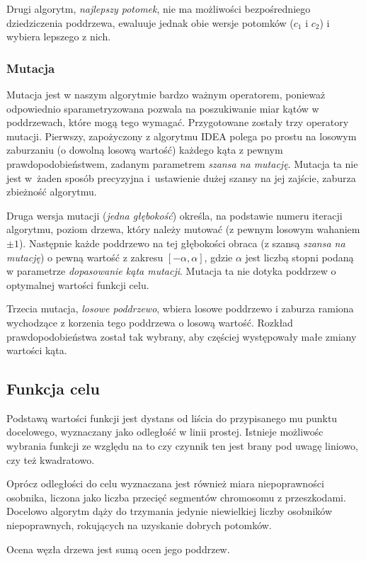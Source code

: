 \documentclass[11pt, leqno]{article}
\renewcommand{\i}[1]{\textit{#1}}
\begin{document}
Drugi algorytm, \i{najlepszy potomek}, nie ma możliwości bezpośredniego dziedziczenia poddrzewa, ewaluuje jednak obie wersje potomków ($c_1$ i $c_2$) i wybiera lepszego z nich.

\subsubsection{Mutacja}
Mutacja jest w naszym algorytmie bardzo ważnym operatorem, ponieważ odpowiednio sparametryzowana pozwala na poszukiwanie miar kątów w poddrzewach, które mogą tego wymagać. Przygotowane zostały trzy operatory mutacji. Pierwszy, zapożyczony z algorytmu IDEA polega po prostu na losowym zaburzaniu (o dowolną losową wartość) każdego kąta z pewnym prawdopodobieństwem, zadanym parametrem \i{szansa na mutację}. Mutacja ta nie jest w~żaden sposób precyzyjna i~ustawienie dużej szansy na jej zajście, zaburza zbieżność algorytmu.

Druga wersja mutacji (\i{jedna głębokość}) określa, na podstawie numeru iteracji algorytmu, poziom drzewa, który należy mutować (z pewnym losowym wahaniem $\pm 1$). Następnie każde poddrzewo na tej głębokości obraca (z szansą \i{szansa na mutację}) o pewną wartość z zakresu $[-\alpha, \alpha]$, gdzie $\alpha$ jest liczbą stopni podaną w parametrze \i{dopasowanie kąta mutacji}. Mutacja ta nie dotyka poddrzew o optymalnej wartości funkcji celu.

Trzecia mutacja, \i{losowe poddrzewo}, wbiera losowe poddrzewo i zaburza ramiona wychodzące z korzenia tego poddrzewa o losową wartość. Rozkład prawdopodobieństwa został tak wybrany, aby częściej występowały małe zmiany wartości kąta.

\subsection{Funkcja celu}
Podstawą wartości funkcji jest dystans od liścia do przypisanego mu punktu docelowego, wyznaczany jako odległość w linii prostej. Istnieje możliwośc wybrania funkcji ze względu na to czy czynnik ten jest brany pod uwagę liniowo, czy też kwadratowo.

Oprócz odległości do celu wyznaczana jest również miara niepoprawności osobnika, liczona jako liczba przecięć segmentów chromosomu z przeszkodami. Docelowo algorytm dąży do trzymania jedynie niewielkiej liczby osobników niepoprawnych, rokujących na uzyskanie dobrych potomków.

Ocena węzła drzewa jest sumą ocen jego poddrzew. 
\end{document}
